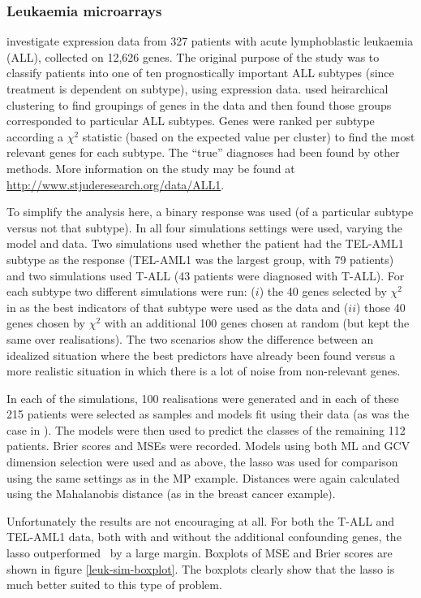 \subsubsection{Leukaemia microarrays}

 investigate expression data from 327 patients with acute lymphoblastic leukaemia (ALL), collected on 12,626 genes. The original purpose of the study was to classify patients into one of ten prognostically important ALL subtypes (since treatment is dependent on subtype), using expression data.  used heirarchical clustering to find groupings of genes in the data and then found those groups corresponded to particular ALL subtypes. Genes were ranked per subtype according a $\chi^2$ statistic (based on the expected value per cluster) to find the most relevant genes for each subtype. The ``true'' diagnoses had been found by other methods. More information on the study may be found at \url{http://www.stjuderesearch.org/data/ALL1}.

To simplify the analysis here, a binary response was used (of a particular subtype versus not that subtype). In all four simulations settings were used, varying the model and data. Two simulations used whether the patient had the TEL-AML1 subtype as the response (TEL-AML1 was the largest group, with 79 patients) and two simulations used T-ALL (43 patients were diagnosed with T-ALL). For each subtype two different simulations were run: ($i$) the 40 genes selected by $\chi^2$ in  as the best indicators of that subtype were used as the data and ($ii$) those 40 genes chosen by $\chi^2$ with an additional 100 genes chosen at random (but kept the same over realisations). The two scenarios show the difference between an idealized situation where the best predictors have already been found versus a more realistic situation in which there is a lot of noise from non-relevant genes. 

In each of the simulations, 100 realisations were generated and in each of these 215 patients were selected as samples and models fit using their data (as was the case in \cite{yeoh2002}). The models were then used to predict the classes of the remaining 112 patients. Brier scores and MSEs were recorded. Models using both ML and GCV dimension selection were used and as above, the lasso was used for comparison using the same settings as in the MP example. Distances were again calculated using the Mahalanobis distance (as in the breast cancer example).

Unfortunately the results are not encouraging at all. For both the T-ALL and TEL-AML1 data, both with and without the additional confounding genes, the lasso outperformed \mdsds\ by a large margin. Boxplots of MSE and Brier scores are shown in figure \ref{leuk-sim-boxplot}. The boxplots clearly show that the lasso is much better suited to this type of problem.

